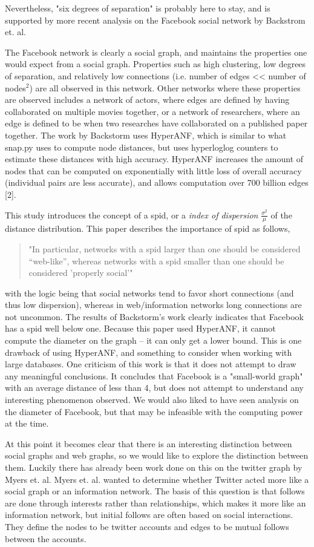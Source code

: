 \documentclass[prodmode,acmtecs]{acmsmall} %
\begin{document}
Nevertheless, "six degrees of separation" is probably here to stay, and is supported by more recent analysis on the Facebook 
social network by Backstrom et. al. 

The Facebook network is clearly a social graph, and maintains the properties one would expect from a social graph.
Properties such as high clustering, low degrees of separation, and relatively low connections (i.e. number of edges << number of nodes$^2$) 
are all observed in this network. Other networks where these properties are observed includes a network of actors, where
edges are defined by having collaborated on multiple movies together, or a network of researchers, where an edge is
defined to be when two researches have collaborated on a published paper together. The work by Backstorm uses HyperANF, which
is similar to what snap.py uses to compute node distances, but uses hyperloglog counters to estimate these distances with
high accuracy. HyperANF increases the amount of nodes that can be computed on exponentially with little loss of overall accuracy 
(individual pairs are less accurate), and allows computation over 700 billion edges [2].


This study introduces the concept of a spid, or a \textit{index of dispersion} $\frac{\sigma^2}{\mu}$ of the distance distribution.
This paper describes the importance of spid as follows, 
\begin{quote}
    "In particular, networks with a spid larger than
    one should be considered “web-like”, whereas networks with a
    spid smaller than one should be considered 'properly social'"
\end{quote}
with the logic being that social networks tend to favor short connections (and thus low dispersion), whereas in web/information networks
long connections are not uncommon. The results of Backstorm's work clearly indicates that Facebook has a spid well below one. Because this
paper used HyperANF, it cannot compute the diameter on the graph -- it can only get a lower bound. This is one drawback of using 
HyperANF, and something to consider when working with large databases. One criticism of this work is that it does not attempt to draw
any meaningful conclusions. It concludes that Facebook is a "small-world graph" with an average distance of less than 4, but does not
attempt to understand any interesting phenomenon observed. We would also liked to have seen analysis on the diameter of Facebook, but 
that may be infeasible with the computing power at the time.


At this point it becomes clear that there is an interesting distinction between social graphs and web graphs, so we would like to explore
the distinction between them. Luckily there has already been work done on this on the twitter graph by Myers et. al. Myers et. al. wanted to 
determine whether Twitter acted more like a social graph or an information network. The basis of this question is that follows are done 
through interests rather than relationships, which makes it more like an information network, but initial follows are often based on 
social interactions. They define the nodes to be twitter accounts and edges to be mutual follows between the accounts.
\end{document}
